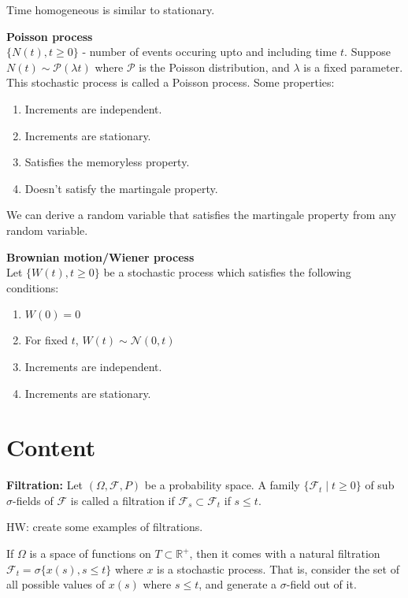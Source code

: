 \documentclass[a4paper]{article}
\newcommand{\nl}{\vspace{0.2cm}\\}
\renewcommand{\sp}{\vspace{0.2cm}}
\newcommand{\F}{\mathcal{F}}
\renewcommand{\P}{\mathcal{P}}
\newcommand{\N}{\mathcal{N}}
\newcommand{\R}{\mathbb{R}}
\begin{document}
Time homogeneous is similar to stationary.
\sp
\begin{eg}
    \textbf{Poisson process}\nl
    $\{N(t), t \ge 0\}$ - number of events occuring upto and including time $t$. Suppose $N(t) \sim \P(\lambda t)$ where $\P$ is the Poisson distribution, and $\lambda$ is a fixed
    parameter. This stochastic process is called a Poisson process. Some properties:
    \begin{enumerate}
        \item Increments are independent.
        \item Increments are stationary.
        \item Satisfies the memoryless property.
        \item Doesn't satisfy the martingale property.
    \end{enumerate}
    We can derive a random variable that satisfies the martingale property from any random variable.
\end{eg}
\sp
\begin{eg}
    \textbf{Brownian motion/Wiener process}\nl
    Let $\{W(t), t \ge 0\}$ be a stochastic process which satisfies the following conditions:
    \begin{enumerate}
        \item $W(0) = 0$
        \item For fixed $t$, $W(t) \sim \N(0, t)$
        \item Increments are independent.
        \item Increments are stationary.
    \end{enumerate}
\end{eg}

\section{Content}


\begin{defn}
    \textbf{Filtration:}
    Let $(\Omega, \F, P)$ be a probability space. A family $\{\F_t \mid t \ge 0\}$ of sub $\sigma$-fields of $\F$ is called a filtration if $\F_s \subset \F_t$ if $s \le t$.
\end{defn}
\sp
HW: create some examples of filtrations.\nl
\begin{defn}
    If $\Omega$ is a space of functions on $T \subset \R^+$, then it comes with a natural filtration $\F_t = \sigma \{x(s), s \le t\}$ where $x$ is a stochastic process. That is, consider the
    set of all possible values of $x(s)$ where $s \le t$, and generate a $\sigma$-field out of it.

\end{defn}
\end{document}
